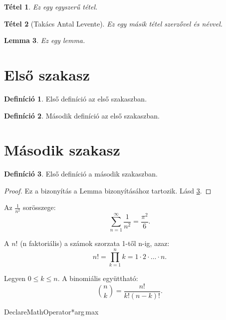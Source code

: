 \documentclass{article}
\newtheorem{theorem}{Tétel}
\begin{document}
\begin{theorem}
Ez egy egyszerű tétel.
\end{theorem}

\begin{theorem}[Takács Antal Levente] 
Ez egy másik tétel szerzővel és névvel.
\end{theorem}

\newtheorem{lemma}[theorem]{Lemma} 

\begin{lemma}
Ez egy lemma.
\label{lem:lemma}
\end{lemma}

\theoremstyle{definition} %
\newtheorem{definition}{Definíció}[section] 

\section{Első szakasz}

\begin{definition}
Első definíció az első szakaszban.
\end{definition}

\begin{definition}
Második definíció az első szakaszban.
\end{definition}

\section{Második szakasz}

\begin{definition}
Első definíció a második szakaszban.
\end{definition}

\begin{proof}
Ez a bizonyítás a Lemma bizonyításához tartozik. Lásd \ref{lem:lemma}. %
\end{proof}
\newpage

Az \( \frac{1}{n^2} \) sorösszege: 
\[
\sum_{n=1}^{\infty} \frac{1}{n^2} = \frac{\pi^2}{6}.
\]

A \( n! \) (n faktoriális) a számok szorzata 1-től n-ig, azaz:
\[
n! = \prod_{k=1}^{n} k = 1 \cdot 2 \cdot \ldots \cdot n.
\]

Legyen \( 0 \leq k \leq n \). A binomiális együttható:
\[
\binom{n}{k} = \frac{n!}{k!(n-k)!}.
\]

DeclareMathOperator*{\argmax}{arg\,max} %
\end{document}
